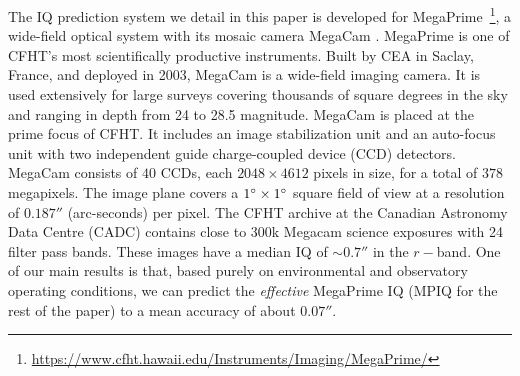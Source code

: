 
The IQ prediction system we detail in this paper is developed for MegaPrime~\footnote{\url{https://www.cfht.hawaii.edu/Instruments/Imaging/MegaPrime/}}, a wide-field optical system with its mosaic camera MegaCam \citep{megacam}. MegaPrime is one of CFHT's most scientifically productive instruments. Built by CEA in Saclay, France, and deployed in 2003, MegaCam is a wide-field imaging camera. It is used extensively for large surveys covering thousands of square degrees in the sky and ranging in depth from 24 to 28.5 magnitude. MegaCam is placed at the prime focus of CFHT.  It includes an image stabilization unit and an auto-focus unit with two independent guide charge-coupled device (CCD) detectors. MegaCam consists of $40$ CCDs, each $2048 \times 4612$ pixels in size, for a total of $378$ megapixels. The image plane covers a $1 \degree \times 1 \degree$ square field of view at a resolution of $0.187''$ (arc-seconds) per pixel. The CFHT archive at the Canadian Astronomy Data Centre (CADC) contains close to 300k Megacam science exposures with 24 filter pass bands. These images have a median IQ of $\sim0.7''$ in the $r-$band. %
One of our main results is that, based purely on environmental and observatory operating conditions, we can predict the \textit{effective} MegaPrime IQ (MPIQ for the rest of the paper) to a mean accuracy of about $0.07''$.

